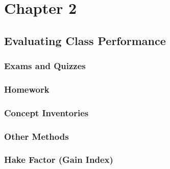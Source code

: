 \chapter[Chapter 2]{Chapter 2}

\section{Evaluating Class Performance}

\subsection{Exams and Quizzes}

\subsection{Homework}

\subsection{Concept Inventories}

\subsection{Other Methods}

\subsection{Hake Factor (Gain Index)}